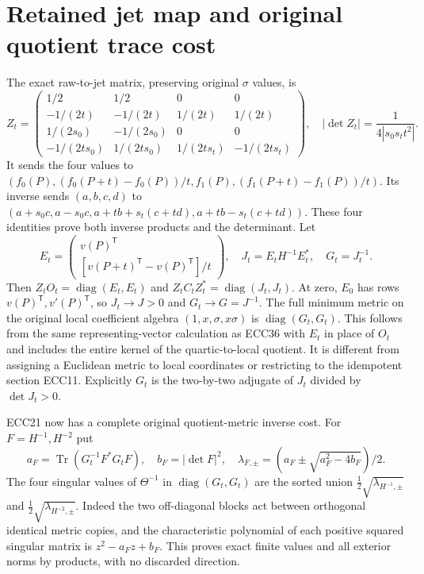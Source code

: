 \documentclass[11pt]{article}
\newcommand{\diag}{\operatorname{diag}}
\providecommand{\Tr}{\operatorname{Tr}}
\providecommand{\Tr}{\operatorname{Tr}}
\begin{document}
\section{Retained jet map and original quotient trace cost}
The exact raw-to-jet matrix, preserving original $\sigma$ values, is
\begin{equation}
 Z_t=\begin{pmatrix}
 1/2&1/2&0&0\\-1/(2t)&-1/(2t)&1/(2t)&1/(2t)\\
 1/(2s_0)&-1/(2s_0)&0&0\\
 -1/(2ts_0)&1/(2ts_0)&1/(2ts_t)&-1/(2ts_t)
 \end{pmatrix},\quad
 |\det Z_t|=\frac1{4|s_0s_tt^2|}.
 \tag{ECC38}
\end{equation}
It sends the four values to
$(f_0(P),(f_0(P+t)-f_0(P))/t,f_1(P),(f_1(P+t)-f_1(P))/t)$.
Its inverse sends $(a,b,c,d)$ to
$(a+s_0c,a-s_0c,a+tb+s_t(c+td),a+tb-s_t(c+td))$.
These four identities prove both inverse products and the determinant.
Let
\begin{equation}
 E_t=\begin{pmatrix}v(P)^{\mathsf T}\\
 [v(P+t)^{\mathsf T}-v(P)^{\mathsf T}]/t\end{pmatrix},\quad
 J_t=E_tH^{-1}E_t^*,\quad G_t=J_t^{-1}.
 \tag{ECC39}
\end{equation}
Then $Z_tO_t=\diag(E_t,E_t)$ and
$Z_tC_tZ_t^*=\diag(J_t,J_t)$. At zero, $E_0$ has rows
$v(P)^{\mathsf T},v'(P)^{\mathsf T}$, so $J_t\to J>0$ and
$G_t\to G=J^{-1}$. The full minimum metric on the original local
coefficient algebra $(1,x,\sigma,x\sigma)$ is
$\diag(G_t,G_t)$. This follows from the same representing-vector
calculation as ECC36 with $E_t$ in place of $O_t$ and includes the entire
kernel of the quartic-to-local quotient. It is different from assigning
a Euclidean metric to local coordinates or restricting to the idempotent
section ECC11. Explicitly $G_t$ is the two-by-two adjugate of $J_t$
divided by $\det J_t>0$.

ECC21 now has a complete original quotient-metric inverse cost. For
$F=H^{-1},H^{-2}$ put
\begin{equation}
 a_F=\Tr(G_t^{-1}F^*G_tF),\quad b_F=|\det F|^2,\quad
 \lambda_{F,\pm}=(a_F\pm\sqrt{a_F^2-4b_F})/2.
 \tag{ECC40}
\end{equation}
The four singular values of $\Theta^{-1}$ in
$\diag(G_t,G_t)$ are the sorted union
$\tfrac12\sqrt{\lambda_{H^{-1},\pm}}$ and
$\tfrac12\sqrt{\lambda_{H^{-2},\pm}}$. Indeed the two off-diagonal
blocks act between orthogonal identical metric copies, and the
characteristic polynomial of each positive squared singular matrix is
$z^2-a_Fz+b_F$. This proves exact finite values and all exterior norms
by products, with no discarded direction.
\end{document}
